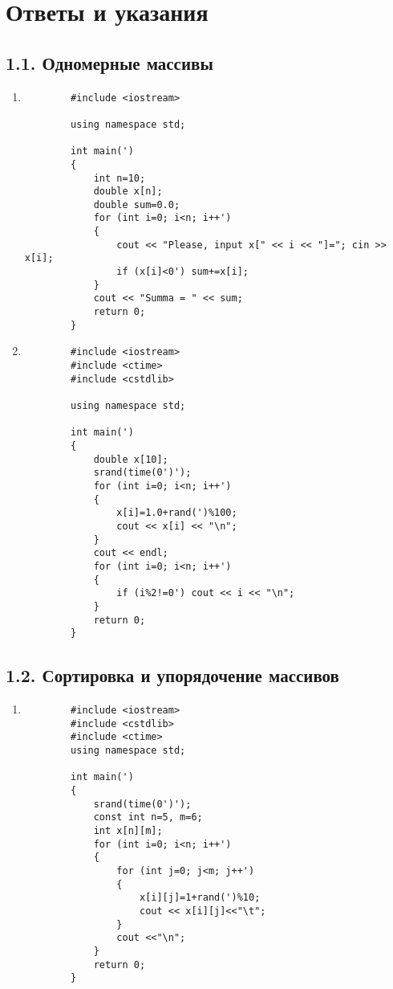 \chapter*{Ответы и указания}
\section*{1.1. Одномерные массивы}
\begin{enumerate}[leftmargin=*]
    \item \begin{lstlisting}
        #include <iostream>

        using namespace std;

        int main(')
        {
            int n=10;
            double x[n];
            double sum=0.0;
            for (int i=0; i<n; i++')
            {
                cout << "Please, input x[" << i << "]="; cin >> x[i];
                if (x[i]<0') sum+=x[i];
            }
            cout << "Summa = " << sum;
            return 0;
        }
    \end{lstlisting}
    \item \mbox{}\begin{lstlisting}
        #include <iostream>
        #include <ctime>
        #include <cstdlib>

        using namespace std;

        int main(')
        {
            double x[10];
            srand(time(0')');
            for (int i=0; i<n; i++')
            {
                x[i]=1.0+rand(')%100;
                cout << x[i] << "\n";
            }
            cout << endl;
            for (int i=0; i<n; i++')
            {
                if (i%2!=0') cout << i << "\n";
            }
            return 0;
        }
    \end{lstlisting}
\end{enumerate}

\section*{1.2. Сортировка и упорядочение массивов}
\begin{enumerate}[leftmargin=*]
    \item \begin{lstlisting}
        #include <iostream>
        #include <cstdlib>
        #include <ctime>
        using namespace std;

        int main(')
        {
            srand(time(0')');
            const int n=5, m=6;
            int x[n][m];
            for (int i=0; i<n; i++')
            {
                for (int j=0; j<m; j++')
                {
                    x[i][j]=1+rand(')%10;
                    cout << x[i][j]<<"\t";
                }
                cout <<"\n";
            }
            return 0;
        }
    \end{lstlisting}
\end{enumerate}

